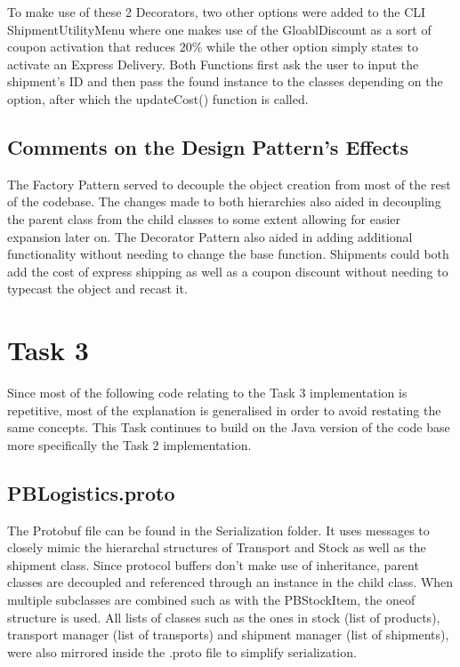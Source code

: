 \documentclass[12pt, a4paper]{report}
\begin{document}
To make use of these 2 Decorators, two other options were added to the CLI ShipmentUtilityMenu where one makes use of the GloablDiscount as a sort of coupon activation that reduces 20\% while the other option simply states to activate an Express Delivery. Both Functions first ask the user to input the shipment's ID and then pass the found instance to the classes depending on the option, after which the updateCost() function is called.

\section{Comments on the Design Pattern's Effects}
The Factory Pattern served to decouple the object creation from most of the rest of the codebase. The changes made to both hierarchies also aided in decoupling the parent class from the child classes to some extent allowing for easier expansion later on. The Decorator Pattern also aided in adding additional functionality without needing to change the base function. Shipments could both add the cost of express shipping as well as a coupon discount without needing to typecast the object and recast it.

\chapter{Task 3}
Since most of the following code relating to the Task 3 implementation is repetitive, most of the explanation is generalised in order to avoid restating the same concepts. This Task continues to build on the Java version of the code base more specifically the Task 2 implementation.

\section{PBLogistics.proto}
The Protobuf file can be found in the Serialization folder. It uses messages to closely mimic the hierarchal structures of Transport and Stock as well as the shipment class. Since protocol buffers don't make use of inheritance, parent classes are decoupled and referenced through an instance in the child class. When multiple subclasses are combined such as with the PBStockItem, the oneof structure is used. All lists of classes such as the ones in stock (list of products), transport manager (list of transports) and shipment manager (list of shipments), were also mirrored inside the .proto file to simplify serialization.
\end{document}

